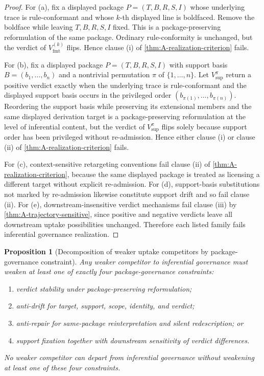 \documentclass[11pt]{article}
\theoremstyle{plain}
\newtheorem{proposition}[theorem]{Proposition}
\theoremstyle{definition}
\begin{document}
\begin{proof}
For (a), fix a displayed package $P=(T,B,R,S,I)$ whose underlying trace is rule-conformant and whose $k$-th displayed line is boldfaced. Remove the boldface while leaving $T,B,R,S,I$ fixed. This is a package-preserving reformulation of the same package. Ordinary rule-conformity is unchanged, but the verdict of $V^{(k)}_{\mathrm{fmt}}$ flips. Hence clause (i) of \cref{thm:A-realization-criterion} fails.

For (b), fix a displayed package $P=(T,B,R,S,I)$ with support basis $B=(b_1,\ldots,b_n)$ and a nontrivial permutation $\pi$ of $\{1,\ldots,n\}$. Let $V^{\pi}_{\mathrm{sup}}$ return a positive verdict exactly when the underlying trace is rule-conformant and the displayed support basis occurs in the privileged order $(b_{\pi(1)},\ldots,b_{\pi(n)})$. Reordering the support basis while preserving its extensional members and the same displayed derivation target is a package-preserving reformulation at the level of inferential content, but the verdict of $V^{\pi}_{\mathrm{sup}}$ flips solely because support order has been privileged without re-admission. Hence either clause (i) or clause (ii) of \cref{thm:A-realization-criterion} fails.

For (c), context-sensitive retargeting conventions fail clause (ii) of \cref{thm:A-realization-criterion}, because the same displayed package is treated as licensing a different target without explicit re-admission. For (d), support-basis substitutions not marked by re-admission likewise constitute support drift and so fail clause (ii). For (e), downstream-insensitive verdict mechanisms fail clause (iii) by \cref{thm:A-trajectory-sensitive}, since positive and negative verdicts leave all downstream uptake possibilities unchanged. Therefore each listed family fails inferential governance realization.
\end{proof}

\begin{proposition}[Decomposition of weaker uptake competitors by package-governance constraint]
\label{prop:A-weaker-uptake-decomposition}
Any weaker competitor to inferential governance must weaken at least one of exactly four package-governance constraints:
\begin{enumerate}[label=(\roman*), leftmargin=2.5em]
    \item verdict stability under package-preserving reformulation;
    \item anti-drift for target, support, scope, identity, and verdict;
    \item anti-repair for same-package reinterpretation and silent redescription; or
    \item support fixation together with downstream sensitivity of verdict differences.
\end{enumerate}
No weaker competitor can depart from inferential governance without weakening at least one of these four constraints.
\end{proposition}
\end{document}
